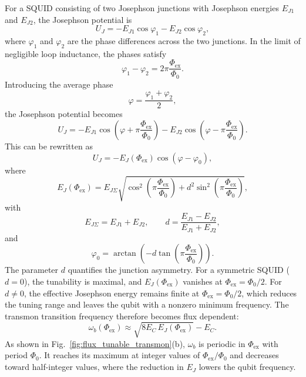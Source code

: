 For a SQUID consisting of two Josephson junctions with Josephson energies \(E_{J1}\) and \(E_{J2}\), the Josephson potential is
\begin{equation}
    U_J = -E_{J1}\cos\varphi_1 - E_{J2}\cos\varphi_2,
\end{equation}
where \(\varphi_1\) and \(\varphi_2\) are the phase differences across the two junctions. In the limit of negligible loop inductance, the phases satisfy
\begin{equation}
    \varphi_1 - \varphi_2 = 2\pi \frac{\Phi_{\mathrm{ex}}}{\Phi_0}.
\end{equation}
Introducing the average phase
\begin{equation}
    \varphi = \frac{\varphi_1+\varphi_2}{2},
\end{equation}
the Josephson potential becomes
\begin{equation}
    U_J
    =
    -E_{J1}\cos\!\left(\varphi+\pi\frac{\Phi_{\mathrm{ex}}}{\Phi_0}\right)
    -E_{J2}\cos\!\left(\varphi-\pi\frac{\Phi_{\mathrm{ex}}}{\Phi_0}\right).
\end{equation}
This can be rewritten as
\begin{equation}
    U_J = -E_J(\Phi_{\mathrm{ex}})\cos(\varphi-\varphi_0),
\end{equation}
where
\begin{equation}
    E_J(\Phi_{\mathrm{ex}})
    =
    E_{J\Sigma}
    \sqrt{
        \cos^2\!\left(\pi\frac{\Phi_{\mathrm{ex}}}{\Phi_0}\right)
        +
        d^2 \sin^2\!\left(\pi\frac{\Phi_{\mathrm{ex}}}{\Phi_0}\right)
    },
\end{equation}
with
\begin{equation}
    E_{J\Sigma}=E_{J1}+E_{J2},
    \qquad
    d=\frac{E_{J1}-E_{J2}}{E_{J1}+E_{J2}},
\end{equation}
and
\begin{equation}
    \varphi_0 = \arctan\!\left( -d\tan\!\left(\pi\frac{\Phi_{\mathrm{ex}}}{\Phi_0}\right) \right).
\end{equation}
The parameter \(d\) quantifies the junction asymmetry. For a symmetric SQUID (\(d=0\)), the tunability is maximal, and \(E_J(\Phi_{\mathrm{ex}})\) vanishes at \(\Phi_{\mathrm{ex}}=\Phi_0/2\). For \(d\neq 0\), the effective Josephson energy remains finite at \(\Phi_{\mathrm{ex}}=\Phi_0/2\), which reduces the tuning range and leaves the qubit with a nonzero minimum frequency. The transmon transition frequency therefore becomes flux dependent:
\begin{equation}
    \omega_b(\Phi_{\mathrm{ex}})
    \approx
    \sqrt{8E_C\,E_J(\Phi_{\mathrm{ex}})} - E_C.
\end{equation}
As shown in Fig.~\ref{fig:flux_tunable_transmon}(b), \(\omega_b\) is periodic in \(\Phi_{\mathrm{ex}}\) with period \(\Phi_0\). It reaches its maximum at integer values of \(\Phi_{\mathrm{ex}}/\Phi_0\) and decreases toward half-integer values, where the reduction in \(E_J\) lowers the qubit frequency.

